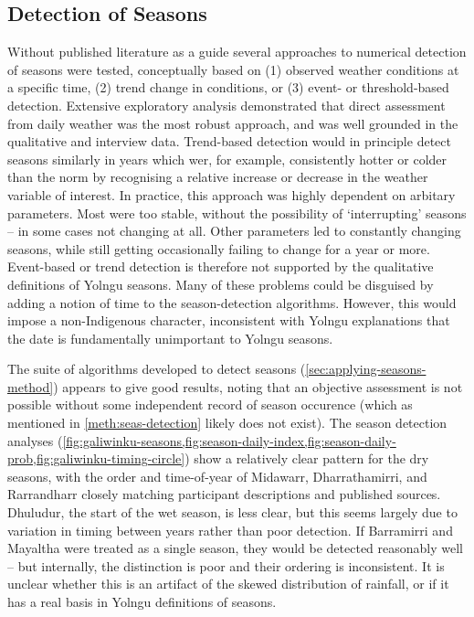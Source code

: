 \subsection{Detection of Seasons}
\label{subsec:disc-season-detection}

Without published literature as a guide several approaches to numerical
detection of seasons were tested, conceptually based on (1) observed weather conditions
at a specific time, (2) trend change in conditions, or (3) event- or threshold-based
detection.  Extensive exploratory analysis demonstrated that direct assessment
from daily weather was the most robust approach, and was well grounded in the
qualitative and interview data.
%
Trend-based detection would in principle detect seasons similarly in years
which wer, for example, consistently hotter or colder than the norm by recognising
a relative increase or decrease in the weather variable of interest.
In practice, this approach was highly dependent on arbitary parameters.
Most were too stable, without the possibility of `interrupting' seasons --
in some cases not changing at all.  Other parameters led to constantly
changing seasons, while still getting occasionally failing to change for a
year or more.  Event-based or trend detection is therefore not supported by
the qualitative definitions of Yolngu seasons.
%
Many of these problems could be disguised by adding a notion of time to the
season-detection algorithms.  However, this would impose a non-Indigenous
character, inconsistent with Yolngu explanations that the date
is fundamentally unimportant to Yolngu seasons.


The suite of algorithms developed to detect seasons (\cref{sec:applying-seasons-method})
appears to give good results, noting that an objective assessment is not
possible without some independent record of season occurence (which as
mentioned in \cref{meth:seas-detection} likely does not exist).
%
The season detection analyses
(\cref{fig:galiwinku-seasons,fig:season-daily-index,fig:season-daily-prob,fig:galiwinku-timing-circle})
show a relatively clear pattern for the
dry seasons, with the order and time-of-year of Midawarr, Dharrathamirri, and
Rarrandharr closely matching participant descriptions and published sources.
Dhuludur, the start of the wet season, is less clear, but this seems largely due to variation in timing between
years rather than poor detection.  If Barramirri and Mayaltha were treated as
a single season, they would be detected reasonably well -- but internally,
the distinction is poor and their ordering is inconsistent. It is unclear
whether this is an artifact of the skewed distribution of rainfall,
or if it has a real basis in Yolngu definitions of seasons.


